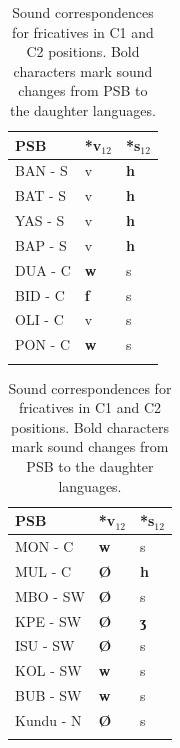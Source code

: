 \documentclass[output=paper,colorlinks,citecolor=brown
]{langscibook}
\begin{document}
\begin{table}
\caption{Sound correspondences for fricatives in C1 and C2 positions. Bold characters mark sound changes from PSB to the daughter languages.}
\label{tab:grollemundbrownrule:fricativesc1andc2}
 \begin{tabular}{lll}
  \lsptoprule
\textbf{PSB} & \textbf{*v$_{12}$} & \textbf{*s$_{12}$} \\
\midrule
BAN - S      & v             & \textbf{h}    \\
BAT - S      & v             & \textbf{h}    \\
YAS - S      & v             & \textbf{h}    \\
BAP - S      & v             & \textbf{h}    \\
DUA - C      & \textbf{w}    & s             \\
BID - C      & \textbf{f}    & s             \\
OLI - C      & v             & s             \\
PON - C      & \textbf{w}    & s             \\
   \lspbottomrule
\end{tabular}
\qquad
 \begin{tabular}{lll}
  \lsptoprule
\textbf{PSB} & \textbf{*v$_{12}$} & \textbf{*s$_{12}$} \\
\midrule
MON - C      & \textbf{w}    & s             \\
MUL - C      & \textbf{Ø}    & \textbf{h}    \\
MBO - SW     & \textbf{Ø}    & s             \\
KPE - SW     & \textbf{Ø}    & \textbf{ʒ}    \\
ISU - SW     & \textbf{Ø}    & s             \\
KOL - SW     & \textbf{w}    & s             \\
BUB - SW     & \textbf{w}    & s             \\
Kundu - N    & \textbf{Ø}    & s       \\ 
   \lspbottomrule
 \end{tabular}
\end{table}
\end{document}
